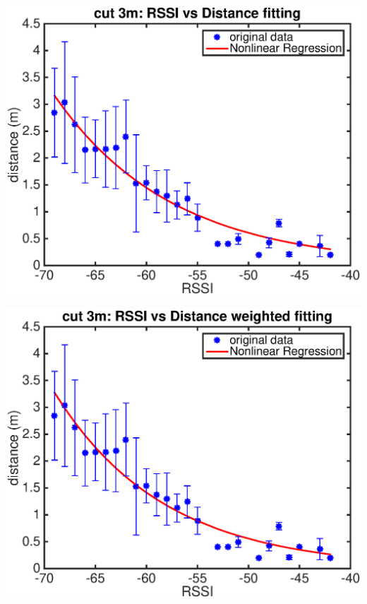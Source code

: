 \documentclass[11pt]{beamer}
\begin{document}
\begin{frame}
\includegraphics[width=\textwidth]{cut_3m_rssi_dis_fit_4dot4m.eps} 
\end{frame}

\begin{frame}
\includegraphics[width=\textwidth]{cut_3m_rssi_dis_fit_weighted_4dot4m.eps} 
\end{frame}
\end{document}

